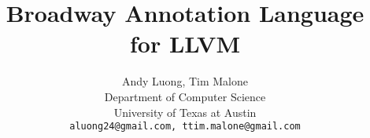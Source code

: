\documentclass[12pt]{report}
\title{Broadway Annotation Language for LLVM}
\author{Andy Luong, Tim Malone\\
Department of Computer Science\\
University of Texas at Austin\\
{\tt aluong24@gmail.com, ttim.malone@gmail.com}}
\date{}
\begin{document}
\maketitle
\newpage

\tableofcontents
\newpage
















\begin{small}


\end{small}
\end{document}

